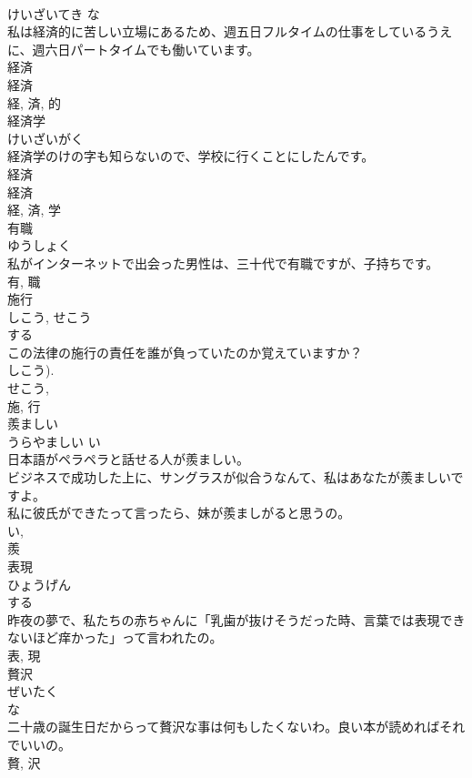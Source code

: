 \documentclass[8pt]{extreport}
\begin{document}
\begin{CJK}{UTF8}{min}
\\	けいざいてき	な 
\\	私は経済的に苦しい立場にあるため、週五日フルタイムの仕事をしているうえに、週六日パートタイムでも働いています。	
\\	経済 
\\	経済 
\\	経, 済, 的	
\\	経済学	
\\	けいざいがく	
\\	経済学のけの字も知らないので、学校に行くことにしたんです。	
\\	経済 
\\	経済 
\\	経, 済, 学	
\\	有職	
\\	ゆうしょく	
\\	私がインターネットで出会った男性は、三十代で有職ですが、子持ちです。	
\\	有, 職	
\\	施行	
\\	しこう, せこう	
\\	する 
\\	この法律の施行の責任を誰が負っていたのか覚えていますか？	
\\	しこう). 
\\	せこう, 
\\	施, 行	
\\	羨ましい	
\\	うらやましい	い 
\\	日本語がペラペラと話せる人が羨ましい。	
\\	ビジネスで成功した上に、サングラスが似合うなんて、私はあなたが羨ましいですよ。	
\\	私に彼氏ができたって言ったら、妹が羨ましがると思うの。	
\\	い, 
\\	羨	
\\	表現	
\\	ひょうげん	
\\	する 
\\	昨夜の夢で、私たちの赤ちゃんに「乳歯が抜けそうだった時、言葉では表現できないほど痒かった」って言われたの。	
\\	表, 現	
\\	贅沢	
\\	ぜいたく	
\\	な 
\\	二十歳の誕生日だからって贅沢な事は何もしたくないわ。良い本が読めればそれでいいの。	
\\	贅, 沢	

\end{CJK}
\end{document}
